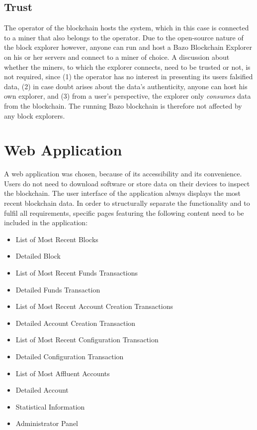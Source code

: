 \subsection{Trust}
The operator of the blockchain hosts the system, which in this case is connected to a miner that also belongs to the operator. Due to the open-source nature of the block explorer however, anyone can run and host a Bazo Blockchain Explorer on his or her servers and connect to a miner of choice. A discussion about whether the miners, to which the explorer connects, need to be trusted or not, is not required, since (1) the operator has no interest in presenting its users falsified data, (2) in case doubt arises about the data's authenticity, anyone can host his own explorer, and (3) from a user's perspective, the explorer only \emph{consumes} data from the blockchain. The running Bazo blockchain is therefore not affected by any block explorers.

\section{Web Application}
A web application was chosen, because of its accessibility and its convenience. Users do not need to download software or store data on their devices to inspect the blockchain. The user interface of the application always displays the most recent blockchain data.  In order to structurally separate the functionality and to fulfil all requirements, specific pages featuring the following content need to be included in the application:

\begin{itemize}
\item{List of Most Recent Blocks}
\item{Detailed Block}
\item{List of Most Recent Funds Transactions}
\item{Detailed Funds Transaction}
\item{List of Most Recent Account Creation Transactions}
\item{Detailed Account Creation Transaction}
\item{List of Most Recent Configuration Transaction}
\item{Detailed Configuration Transaction}
\item{List of Most Affluent Accounts}
\item{Detailed Account}
\item{Statistical Information}
\item{Administrator Panel}
\end{itemize}

